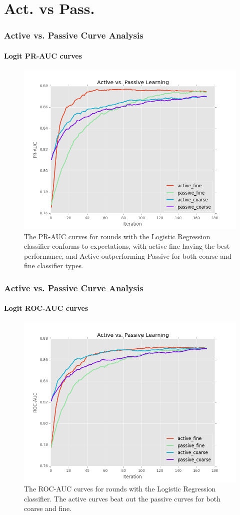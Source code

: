 \documentclass{beamer}
\begin{document}
\section{Act. vs Pass.}
\begin{frame}
    \frametitle{Active vs. Passive Curve Analysis}
    \framesubtitle{Logit PR-AUC curves}
    \begin{figure}[!htb]
        \centering
        \includegraphics[width=0.70\columnwidth]{fig/runActPassLogReg_pr}
        \caption{The PR-AUC curves for rounds with the Logistic
    Regression classifier conforms to expectations, with active fine having
    the best performance, and Active outperforming Passive for both coarse
    and fine classifier types.}
    \label{fig:runActPassLogReg_pr}
    \end{figure}
\end{frame}
\begin{frame}
    \frametitle{Active vs. Passive Curve Analysis}
    \framesubtitle{Logit ROC-AUC curves}
    \begin{figure}[!htb]
        \centering
        \includegraphics[width=0.70\columnwidth]{fig/runActPassLogReg_roc}
        \caption{The ROC-AUC curves for rounds with the
    Logistic Regression classifier. The active curves beat out the passive
    curves for both coarse and fine.}
    \label{fig:runActPassLogReg_roc}
    \end{figure}
\end{frame}
\end{document}
